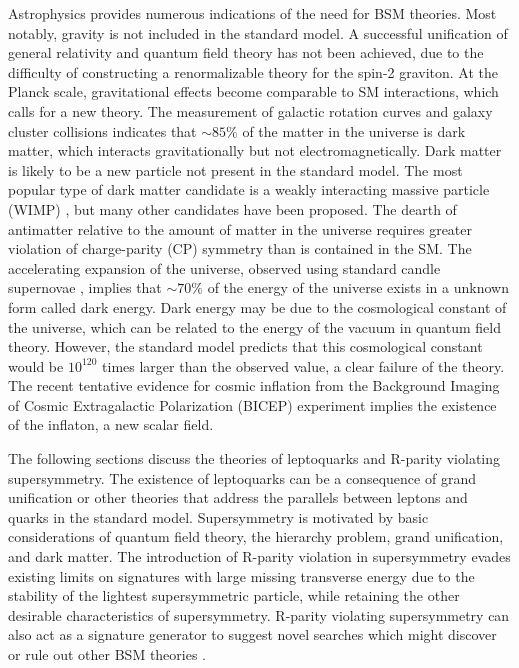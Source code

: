 Astrophysics provides numerous indications of the need for BSM theories. Most notably, gravity is not included in the standard model. A successful unification of general relativity and quantum field theory has not been achieved, due to the difficulty of constructing a renormalizable theory for the spin-2 graviton. At the Planck scale, gravitational effects become comparable to SM interactions, which calls for a new theory. The measurement of galactic rotation curves and galaxy cluster collisions \cite{BulletCluster} indicates that ${\sim} 85\%$ of the matter in the universe is dark matter, which interacts gravitationally but not electromagnetically. Dark matter is likely to be a new particle not present in the standard model. The most popular type of dark matter candidate is a weakly interacting massive particle (WIMP) \cite{Morrissey20121}, but many other candidates have been proposed. The dearth of antimatter relative to the amount of matter in the universe requires greater violation of charge-parity (CP) symmetry than is contained in the SM. The accelerating expansion of the universe, observed using standard candle supernovae \cite{Supernova98,Supernova99}, implies that ${\sim} 70\%$ of the energy of the universe exists in a unknown form called dark energy. Dark energy may be due to the cosmological constant of the universe, which can be related to the energy of the vacuum in quantum field theory. However, the standard model predicts that this cosmological constant would be $10^{120}$ times larger than the observed value, a clear failure of the theory. The recent tentative evidence for cosmic inflation from the Background Imaging of Cosmic Extragalactic Polarization (BICEP) experiment \cite{BICEP} implies the existence of the inflaton, a new scalar field.

The following sections discuss the theories of leptoquarks and R-parity violating supersymmetry. The existence of leptoquarks can be a consequence of grand unification or other theories that address the parallels between leptons and quarks in the standard model. Supersymmetry is motivated by basic considerations of quantum field theory, the hierarchy problem, grand unification, and dark matter. The introduction of R-parity violation in supersymmetry evades existing limits on signatures with large missing transverse energy due to the stability of the lightest supersymmetric particle, while retaining the other desirable characteristics of supersymmetry. R-parity violating supersymmetry can also act as a signature generator to suggest novel searches which might discover or rule out other BSM theories \cite{EvansSigGen}.


